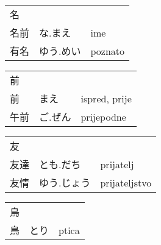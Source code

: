 

\newenvironment{dictentry}[1]{
	\begin{tabular}{p{2cm} p{3cm} p{10cm}}
		#1 &&\\
}{
	\end{tabular}
	\vspace{20pt}
}

\newcommand{\example}[3]{
	\hspace*{\fill}#1 & #2 & #3\\
}

\author{ロボット君}


\begin{dictentry}{名}
\example{名前}{な.まえ}{ime}
\example{有名}{ゆう.めい}{poznato}
\end{dictentry}

\begin{dictentry}{前}
\example{前}{まえ}{ispred, prije}
\example{午前}{ご.ぜん}{prijepodne}
\end{dictentry}

\begin{dictentry}{友}
\example{友達}{とも.だち}{prijatelj}
\example{友情}{ゆう.じょう}{prijateljstvo}
\end{dictentry}

\begin{dictentry}{鳥}
\example{鳥}{とり}{ptica}
\end{dictentry}

